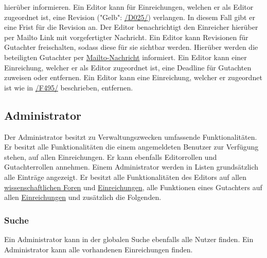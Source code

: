 \begin{description}
    hierüber informieren.
     Ein Editor kann für Einreichungen, welchen er als Editor zugeordnet ist,
    eine Revision ("Gelb": \hyperref[d025]{/D025/}) verlangen. In diesem Fall gibt er eine Frist für die Revision an.
    Der Editor benachrichtigt den Einreicher hierüber per Mailto Link mit vorgefertigter Nachricht.
     Ein Editor kann Revisionen für Gutachter freischalten, sodass diese für sie sichtbar werden.
    Hierüber werden die beteiligten Gutachter per \hyperref[glo:mailto]{Mailto-Nachricht} informiert.
     Ein Editor kann einer Einreichung, welcher er als Editor zugeordnet ist, eine Deadline für
    Gutachten zuweisen oder entfernen.
     Ein Editor kann eine Einreichung, welcher er zugeordnet ist wie in
    \hyperref[funkt:495]{/F495/} beschrieben, entfernen.
\end{description}

\subsection{Administrator}
Der Administrator besitzt zu Verwaltungszwecken umfassende Funktionalitäten. Er besitzt alle Funktionalitäten die
einem angemeldeten Benutzer zur Verfügung stehen, auf allen Einreichungen. Er kann ebenfalls Editorrollen und Gutachterrollen annehmen.
Einem Administrator werden in Listen grundsätzlich alle Einträge angezeigt.
Er besitzt alle Funktionalitäten des Editors auf allen \hyperref[ed:wissFor]{wissenschaftlichen Foren} und \hyperref[ed:ein]{Einreichungen},
alle Funktionen eines Gutachters auf allen \hyperref[gut:ein]{Einreichungen}
und zusätzlich die Folgenden.

\subsubsection{Suche}
\begin{description}
     Ein Administrator kann in der globalen Suche ebenfalls alle Nutzer finden.
     Ein Administrator kann alle vorhandenen Einreichungen finden.
\end{description}

